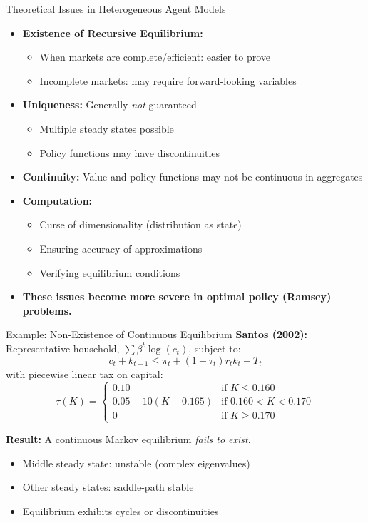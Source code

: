 \documentclass[10pt,english,aspectratio=169]{beamer}
\begin{document}
\begin{frame}{Theoretical Issues in Heterogeneous Agent Models}
\begin{itemize}
\item \textbf{Existence of Recursive Equilibrium:}
\begin{itemize}
    \item When markets are complete/efficient: easier to prove
    \item Incomplete markets: may require forward-looking variables
\end{itemize}

\medskip
\item \textbf{Uniqueness:} Generally \emph{not} guaranteed
\begin{itemize}
    \item Multiple steady states possible
    \item Policy functions may have discontinuities
\end{itemize}

\medskip
\item \textbf{Continuity:} Value and policy functions may not be continuous in aggregates

\medskip
\item \textbf{Computation:}
\begin{itemize}
    \item Curse of dimensionality (distribution as state)
    \item Ensuring accuracy of approximations
    \item Verifying equilibrium conditions
\end{itemize}

\medskip
\item \textbf{These issues become more severe in optimal policy (Ramsey) problems.}
\end{itemize}
\end{frame}

\begin{frame}{Example: Non-Existence of Continuous Equilibrium}
\textbf{Santos (2002):} Representative household, $\sum \beta^t \log(c_t)$, subject to:
\[
c_{t}+k_{t+1} \leq \pi_{t}+(1-\tau_{t})r_{t}k_{t}+T_{t}
\]
with piecewise linear tax on capital:
\[
\tau(K) = \begin{cases}
0.10 & \text{if } K \leq 0.160 \\
0.05 - 10(K - 0.165) & \text{if } 0.160 < K < 0.170 \\
0 & \text{if } K \geq 0.170
\end{cases}
\]

\medskip
\textbf{Result:} A continuous Markov equilibrium \emph{fails to exist}.
\begin{itemize}
    \item Middle steady state: unstable (complex eigenvalues)
    \item Other steady states: saddle-path stable
    \item Equilibrium exhibits cycles or discontinuities
\end{itemize}
\end{frame}
\end{document}
